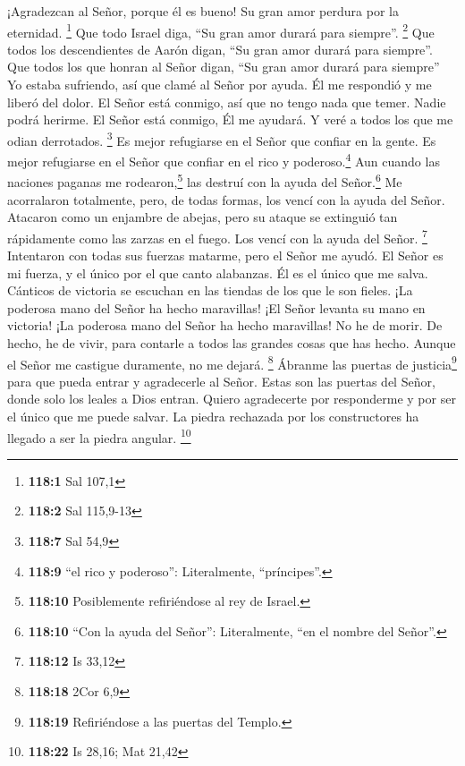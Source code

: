  ¡Agradezcan al Señor, porque él es bueno! Su gran amor
perdura por la eternidad. \footnote{\textbf{118:1} Sal 107,1}
 Que todo Israel diga, ``Su gran amor durará para
siempre''. \footnote{\textbf{118:2} Sal 115,9-13}  Que
todos los descendientes de Aarón digan, ``Su gran amor durará para
siempre''.  Que todos los que honran al Señor digan, ``Su
gran amor durará para siempre''  Yo estaba sufriendo, así
que clamé al Señor por ayuda. Él me respondió y me liberó del dolor.
 El Señor está conmigo, así que no tengo nada que temer.
Nadie podrá herirme.  El Señor está conmigo, Él me
ayudará. Y veré a todos los que me odian derrotados. \footnote{\textbf{118:7}
  Sal 54,9}  Es mejor refugiarse en el Señor que confiar
en la gente.  Es mejor refugiarse en el Señor que confiar
en el rico y poderoso.\footnote{\textbf{118:9} ``el rico y poderoso'':
  Literalmente, ``príncipes''.}  Aun cuando las naciones
paganas me rodearon,\footnote{\textbf{118:10} Posiblemente refiriéndose
  al rey de Israel.} las destruí con la ayuda del Señor.\footnote{\textbf{118:10}
  ``Con la ayuda del Señor'': Literalmente, ``en el nombre del Señor''.}
 Me acorralaron totalmente, pero, de todas formas, los
vencí con la ayuda del Señor.  Atacaron como un enjambre
de abejas, pero su ataque se extinguió tan rápidamente como las zarzas
en el fuego. Los vencí con la ayuda del Señor. \footnote{\textbf{118:12}
  Is 33,12}  Intentaron con todas sus fuerzas matarme,
pero el Señor me ayudó.  El Señor es mi fuerza, y el
único por el que canto alabanzas. Él es el único que me salva.
 Cánticos de victoria se escuchan en las tiendas de los
que le son fieles. ¡La poderosa mano del Señor ha hecho maravillas!
 ¡El Señor levanta su mano en victoria! ¡La poderosa mano
del Señor ha hecho maravillas!  No he de morir. De hecho,
he de vivir, para contarle a todos las grandes cosas que has hecho.
 Aunque el Señor me castigue duramente, no me dejará.
\footnote{\textbf{118:18} 2Cor 6,9}  Ábranme las puertas
de justicia\footnote{\textbf{118:19} Refiriéndose a las puertas del
  Templo.} para que pueda entrar y agradecerle al Señor. 
Estas son las puertas del Señor, donde solo los leales a Dios entran.
 Quiero agradecerte por responderme y por ser el único
que me puede salvar.  La piedra rechazada por los
constructores ha llegado a ser la piedra angular. \footnote{\textbf{118:22}
  Is 28,16; Mat 21,42}

